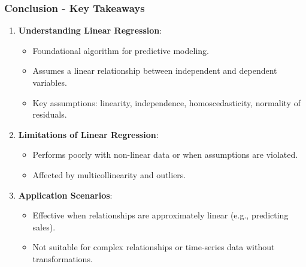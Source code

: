 \documentclass[aspectratio=169]{beamer}
\begin{document}
\begin{frame}[fragile]
    \frametitle{Conclusion - Key Takeaways}
    
    \begin{enumerate}
        \item \textbf{Understanding Linear Regression}:
        \begin{itemize}
            \item Foundational algorithm for predictive modeling.
            \item Assumes a linear relationship between independent and dependent variables.
            \item Key assumptions: linearity, independence, homoscedasticity, normality of residuals.
        \end{itemize}
        
        \item \textbf{Limitations of Linear Regression}:
        \begin{itemize}
            \item Performs poorly with non-linear data or when assumptions are violated.
            \item Affected by multicollinearity and outliers.
        \end{itemize}
        
        \item \textbf{Application Scenarios}:
        \begin{itemize}
            \item Effective when relationships are approximately linear (e.g., predicting sales).
            \item Not suitable for complex relationships or time-series data without transformations.
        \end{itemize}
    \end{enumerate}
\end{frame}
\end{document}
